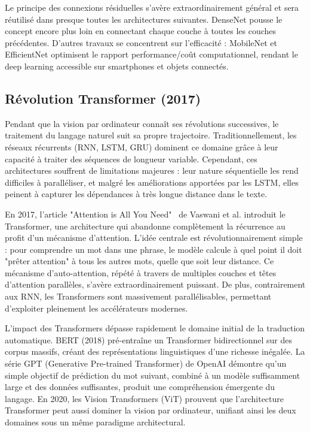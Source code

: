 Le principe des connexions résiduelles s'avère extraordinairement général et sera réutilisé dans presque toutes les architectures suivantes. DenseNet pousse le concept encore plus loin en connectant chaque couche à toutes les couches précédentes. D'autres travaux se concentrent sur l'efficacité : MobileNet et EfficientNet optimisent le rapport performance/coût computationnel, rendant le deep learning accessible sur smartphones et objets connectés.

\subsection{Révolution Transformer (2017)}

Pendant que la vision par ordinateur connaît ses révolutions successives, le traitement du langage naturel suit sa propre trajectoire. Traditionnellement, les réseaux récurrents (RNN, LSTM, GRU) dominent ce domaine grâce à leur capacité à traiter des séquences de longueur variable. Cependant, ces architectures souffrent de limitations majeures : leur nature séquentielle les rend difficiles à paralléliser, et malgré les améliorations apportées par les LSTM, elles peinent à capturer les dépendances à très longue distance dans le texte.

En 2017, l'article "Attention is All You Need"~\cite{Vaswani2017} de Vaswani et al. introduit le Transformer, une architecture qui abandonne complètement la récurrence au profit d'un mécanisme d'attention. L'idée centrale est révolutionnairement simple : pour comprendre un mot dans une phrase, le modèle calcule à quel point il doit "prêter attention" à tous les autres mots, quelle que soit leur distance. Ce mécanisme d'auto-attention, répété à travers de multiples couches et têtes d'attention parallèles, s'avère extraordinairement puissant. De plus, contrairement aux RNN, les Transformers sont massivement parallélisables, permettant d'exploiter pleinement les accélérateurs modernes.

L'impact des Transformers dépasse rapidement le domaine initial de la traduction automatique. BERT (2018) pré-entraîne un Transformer bidirectionnel sur des corpus massifs, créant des représentations linguistiques d'une richesse inégalée. La série GPT (Generative Pre-trained Transformer) de OpenAI démontre qu'un simple objectif de prédiction du mot suivant, combiné à un modèle suffisamment large et des données suffisantes, produit une compréhension émergente du langage. En 2020, les Vision Transformers (ViT) prouvent que l'architecture Transformer peut aussi dominer la vision par ordinateur, unifiant ainsi les deux domaines sous un même paradigme architectural.

